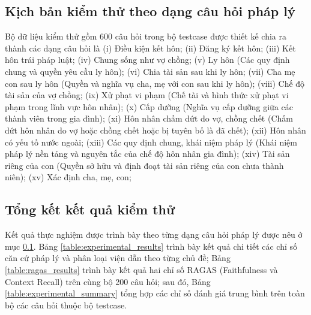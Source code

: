 \documentclass[../DoAn.tex]{subfiles}
\begin{document}
\subsection{Kịch bản kiểm thử theo dạng câu hỏi pháp lý}
\label{subsection:4.9.2}
Bộ dữ liệu kiểm thử gồm 600 câu hỏi trong bộ testcase được thiết kế chia ra thành các dạng câu hỏi là 
(i) Điều kiện kết hôn;
(ii) Đăng ký kết hôn;
(iii) Kết hôn trái pháp luật;
(iv) Chung sống như vợ chồng;
(v) Ly hôn (Các quy định chung và quyền yêu cầu ly hôn);
(vi) Chia tài sản sau khi ly hôn;
(vii) Cha mẹ con sau ly hôn (Quyền và nghĩa vụ cha, mẹ với con sau khi ly hôn);
(viii) Chế độ tài sản của vợ chồng;
(ix) Xử phạt vi phạm (Chế tài và hình thức xử phạt vi phạm trong lĩnh vực hôn nhân);
(x) Cấp dưỡng (Nghĩa vụ cấp dưỡng giữa các thành viên trong gia đình);
(xi) Hôn nhân chấm dứt do vợ, chồng chết (Chấm dứt hôn nhân do vợ hoặc chồng chết hoặc bị tuyên bố là đã chết);
(xii) Hôn nhân có yếu tố nước ngoài;
(xiii) Các quy định chung, khái niệm pháp lý (Khái niệm pháp lý nền tảng và nguyên tắc của chế độ hôn nhân gia đình);
(xiv) Tài sản riêng của con (Quyền sở hữu và định đoạt tài sản riêng của con chưa thành niên);
(xv) Xác định cha, mẹ, con;

\subsection{Tổng kết kết quả kiểm thử}
\label{subsection:4.9.3}

Kết quả thực nghiệm được trình bày theo từng dạng câu hỏi pháp lý được nêu ở mục \ref{subsection:4.9.2}. Bảng \ref{table:experimental_results} trình bày kết quả chi tiết các chỉ số căn cứ pháp lý và phân loại viện dẫn theo từng chủ đề; Bảng \ref{table:ragas_results} trình bày kết quả hai chỉ số RAGAS (Faithfulness và Context Recall) trên cùng bộ 200 câu hỏi; sau đó, Bảng \ref{table:experimental_summary} tổng hợp các chỉ số đánh giá trung bình trên toàn bộ các câu hỏi thuộc bộ testcase.
\end{document}
